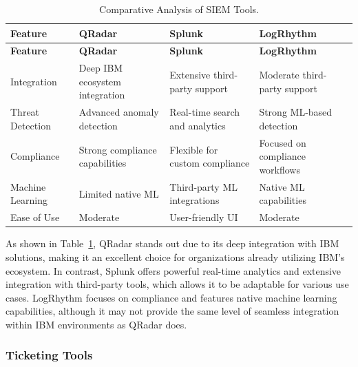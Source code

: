 \begin{longtable}{p{3cm}p{3cm}p{3cm}p{3cm}}
    \caption{Comparative Analysis of SIEM Tools.}
    \label{tab:siem_ca} \\
    \toprule
    \textbf{Feature} & \textbf{QRadar} & \textbf{Splunk} & \textbf{LogRhythm} \\
    \midrule
    \endfirsthead
    \toprule
    \textbf{Feature} & \textbf{QRadar} & \textbf{Splunk} & \textbf{LogRhythm} \\
    \midrule
    \endhead
    \bottomrule
    \endfoot
    \bottomrule
    \endlastfoot
    Integration & Deep IBM ecosystem integration & Extensive third-party support & Moderate third-party support \\
    Threat Detection & Advanced anomaly detection & Real-time search and analytics & Strong ML-based detection \\
    Compliance & Strong compliance capabilities & Flexible for custom compliance & Focused on compliance workflows \\
    Machine Learning & Limited native ML & Third-party ML integrations & Native ML capabilities \\
    Ease of Use & Moderate & User-friendly UI & Moderate \\
\end{longtable}

As shown in Table~\ref{tab:siem_ca}, QRadar stands out due to its deep integration with IBM solutions, making it an excellent choice for organizations already utilizing IBM's ecosystem. 
In contrast, Splunk offers powerful real-time analytics and extensive integration with third-party tools, which allows it to be adaptable for various use cases. 
LogRhythm focuses on compliance and features native machine learning capabilities, although it may not provide the same level of seamless integration within IBM environments as QRadar does.

\clearpage

\subsubsection{Ticketing Tools}

